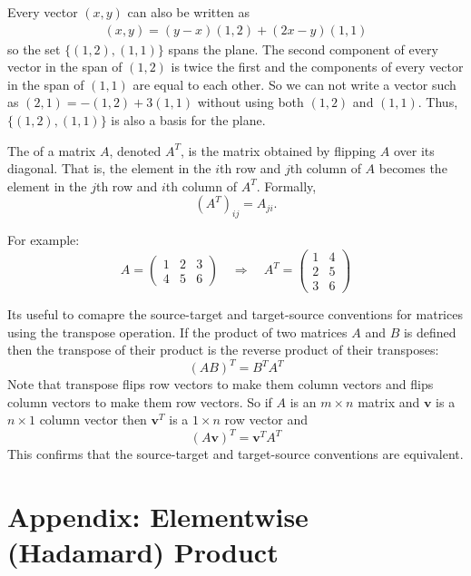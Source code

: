    Every vector $(x,y)$ can also be written as
\begin{eqnarray*}
 (x,y) =(y-x)(1,2) +(2x-y)(1,1)
\end{eqnarray*}  
so the set $\{ (1,2), (1,1) \}$ spans the plane.  The second component of every
vector in the span of $(1,2)$ is twice the first and the components of every 
vector in the span of $(1,1)$ are equal to each other.  So we can not write a
vector such as $(2,1) = -(1,2)+3 (1,1)$ without using both $(1,2)$ and $(1,1)$.
Thus, $\{ (1,2), (1,1) \}$ is also a basis for the plane. 

The  of a matrix \( A \), denoted \( A^T \), is the matrix obtained by flipping \( A \) over its diagonal. That is, the element in the \( i \)th row and \( j \)th column of \( A \) becomes the element in the \( j \)th row and \( i \)th column of \( A^T \). Formally, 
\[
(A^T)_{ij} = A_{ji}.
\]

For example: 
\[
A = \begin{pmatrix}
1 & 2 & 3 \\
4 & 5 & 6
\end{pmatrix}
\quad \Rightarrow \quad
A^T = \begin{pmatrix}
1 & 4 \\
2 & 5 \\
3 & 6
\end{pmatrix}
\]

   Its useful to comapre the source-target and target-source conventions for 
matrices using the transpose operation.  If the product of two matrices $A$ and 
$B$ is defined then the transpose of their product is the reverse product of 
their transposes:
\begin{equation*}
       \left(AB\right)^T = B^T A^T                 
\end{equation*}
Note that transpose flips row vectors to make them column vectors and flips
column vectors to make them row vectors.  So if $A$ is an $m \times n$ matrix 
and $\mathbf{v}$ is a $n \times 1$ column vector then $\mathbf{v}^T$ is a $1 
\times n$ row vector and
\begin{equation*}
       \left(A \mathbf{v} \right)^T =  \mathbf{v}^T A^T                 
\end{equation*}
This confirms that the source-target and target-source conventions are
equivalent.

\section{Appendix: Elementwise (Hadamard) Product}\label{hadamard}

